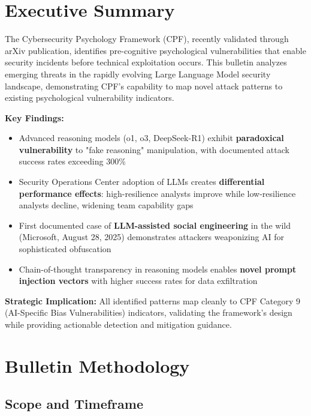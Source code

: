 \documentclass[11pt,a4paper]{article}
\begin{document}
\vspace{1cm}

\section{Executive Summary}

The Cybersecurity Psychology Framework (CPF), recently validated through arXiv publication\cite{canale2025method}, identifies pre-cognitive psychological vulnerabilities that enable security incidents before technical exploitation occurs. This bulletin analyzes emerging threats in the rapidly evolving Large Language Model security landscape, demonstrating CPF's capability to map novel attack patterns to existing psychological vulnerability indicators.

\textbf{Key Findings:}
\begin{itemize}
\item Advanced reasoning models (o1, o3, DeepSeek-R1) exhibit \textbf{paradoxical vulnerability} to "fake reasoning" manipulation, with documented attack success rates exceeding 300\%
\item Security Operations Center adoption of LLMs creates \textbf{differential performance effects}: high-resilience analysts improve while low-resilience analysts decline, widening team capability gaps
\item First documented case of \textbf{LLM-assisted social engineering} in the wild (Microsoft, August 28, 2025) demonstrates attackers weaponizing AI for sophisticated obfuscation
\item Chain-of-thought transparency in reasoning models enables \textbf{novel prompt injection vectors} with higher success rates for data exfiltration
\end{itemize}

\textbf{Strategic Implication:} All identified patterns map cleanly to CPF Category 9 (AI-Specific Bias Vulnerabilities) indicators, validating the framework's design while providing actionable detection and mitigation guidance.

\section{Bulletin Methodology}

\subsection{Scope and Timeframe}
\end{document}
